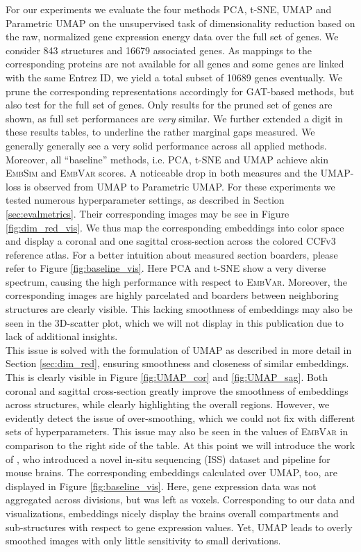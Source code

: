\documentclass[]{article}
\begin{document}
For our experiments we evaluate the four methods PCA, t-SNE, UMAP and Parametric UMAP on the unsupervised task of dimensionality reduction based on the raw, normalized gene expression energy data over the full set of genes. We consider 843 structures and 16679 associated genes. As mappings to the corresponding proteins are not available for all genes and some genes are linked with the same Entrez ID, we yield a total subset of 10689 genes eventually. We prune the corresponding representations accordingly for GAT-based methods, but also test for the full set of genes. Only results for the pruned set of genes are shown, as full set performances are \textit{very} similar. We further extended a digit in these results tables, to underline the rather marginal gaps measured.
We generally generally see a very solid performance across all applied methods. Moreover, all ``baseline'' methods, i.e. PCA, t-SNE and UMAP achieve akin \textsc{EmbSim} and \textsc{EmbVar} scores. A noticeable drop in both measures and the UMAP-loss is observed from UMAP to Parametric UMAP. For these experiments we tested numerous hyperparameter settings, as described in Section \ref{sec:evalmetrics}. Their corresponding images may be see in Figure \ref{fig:dim_red_vis}. We thus map the corresponding embeddings into color space and display a coronal and one sagittal cross-section across the colored CCFv3 reference atlas. For a better intuition about measured section boarders, please refer to Figure \ref{fig:baseline_vis}. 
Here PCA and t-SNE show a very diverse spectrum, causing the high performance with respect to \textsc{EmbVar}. Moreover, the corresponding images are highly parcelated and boarders between neighboring structures are clearly visible. This lacking smoothness of embeddings may also be seen in the 3D-scatter plot, which we will not display in this publication due to lack of additional insights. \\

This issue is solved with the formulation of UMAP as described in more detail in Section \ref{sec:dim_red}, ensuring smoothness and closeness of similar embeddings. This is clearly visible in Figure \ref{fig:UMAP_cor} and \ref{fig:UMAP_sag}. Both coronal and sagittal cross-section greatly improve the smoothness of embeddings across structures, while clearly highlighting the overall regions. However, we evidently detect the issue of over-smoothing, which we could not fix with different sets of hyperparameters. This issue may also be seen in the values of \textsc{EmbVar} in comparison to the right side of the table.
At this point we will introduce the work of \citet{Partel2020}, who introduced a novel in-situ sequencing (ISS) dataset and pipeline for mouse brains. The corresponding embeddings calculated over UMAP, too, are displayed in Figure \ref{fig:baseline_vis}. Here, gene expression data was not aggregated across divisions, but was left as voxels. Corresponding to our data and visualizations, embeddings nicely display the brains overall compartments and sub-structures with respect to gene expression values. Yet, UMAP leads to overly smoothed images with only little sensitivity to small derivations. \\
\end{document}
